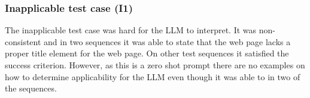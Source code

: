 \subsubsection{Inapplicable test case (I1)}

The inapplicable test case was hard for the LLM to interpret. It was non-consistent and in two sequences it was able to state that the web page lacks a proper title element for the web page. On other test sequences it satisfied the success criterion. However, as this is a zero shot prompt there are no examples on how to determine applicability for the LLM even though it was able to in two of the sequences.